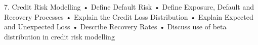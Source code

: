 7. Credit Risk Modelling
•	Define Default Risk
•	Define Exposure, Default and Recovery Processes
•	Explain the Credit Loss Distribution
•	Explain Expected and Unexpected Loss
•	Describe Recovery Rates
•	Discuss use of beta distribution in credit risk modelling
